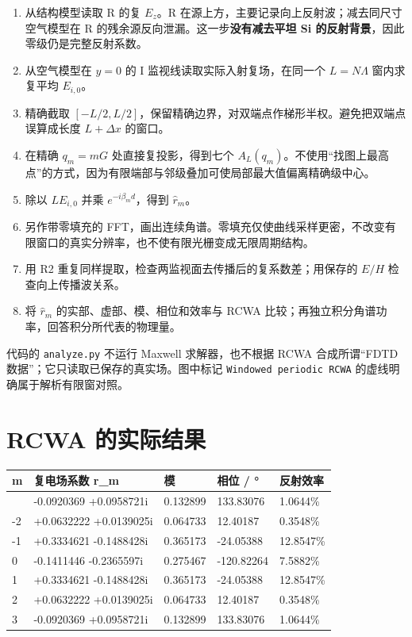 \documentclass[
  chinese,
  UTF8,
  a4paper,
  11pt]{ctexart}
\newcounter{none} %
\providecommand{\tightlist}{%
  \setlength{\itemsep}{0pt}\setlength{\parskip}{0pt}}
\begin{document}
\begin{enumerate}
\def\labelenumi{\arabic{enumi}.}
\tightlist
\item
  从结构模型读取 R 的复 \(E_z\)。R
  在源上方，主要记录向上反射波；减去同尺寸空气模型在 R
  的残余源反向泄漏。这一步\textbf{没有减去平坦 Si
  的反射背景}，因此零级仍是完整反射系数。
\item
  从空气模型在 \(y=0\) 的 I 监视线读取实际入射复场，在同一个
  \(L=N\Lambda\) 窗内求复平均 \(E_{i,0}\)。
\item
  精确截取
  \([-L/2,L/2]\)，保留精确边界，对双端点作梯形半权。避免把双端点误算成长度
  \(L+\Delta x\) 的窗口。
\item
  在精确 \(q_m=mG\) 处直接复投影，得到七个
  \(A_L(q_m)\)。不使用``找图上最高点''的方式，因为有限端部与邻级叠加可使局部最大值偏离精确级中心。
\item
  除以 \(L E_{i,0}\) 并乘 \(e^{-i\beta_md}\)，得到 \(\widehat r_m\)。
\item
  另作带零填充的
  FFT，画出连续角谱。零填充仅使曲线采样更密，不改变有限窗口的真实分辨率，也不使有限光栅变成无限周期结构。
\item
  用 R2 重复同样提取，检查两监视面去传播后的复系数差；用保存的 \(E/H\)
  检查向上传播波关系。
\item
  将 \(\widehat r_m\) 的实部、虚部、模、相位和效率与 RCWA
  比较；再独立积分角谱功率，回答积分所代表的物理量。
\end{enumerate}

代码的 \texttt{analyze.py} 不运行 Maxwell 求解器，也不根据 RCWA
合成所谓``FDTD 数据''；它只读取已保存的真实场。图中标记
\texttt{Windowed\ periodic\ RCWA} 的虚线明确属于解析有限窗对照。

\section{RCWA 的实际结果}\label{rcwa-ux7684ux5b9eux9645ux7ed3ux679c}

{\def\LTcaptype{none} %
\begin{longtable}[]{@{}lllll@{}}
\toprule\noalign{}
m & 复电场系数 r\_m & 模 & 相位 / ° & 反射效率 \\
\midrule\noalign{}
\endhead
\bottomrule\noalign{}
\endlastfoot
-3 & -0.0920369 +0.0958721i & 0.132899 & 133.83076 & 1.0644\% \\
-2 & +0.0632222 +0.0139025i & 0.064733 & 12.40187 & 0.3548\% \\
-1 & +0.3334621 -0.1488428i & 0.365173 & -24.05388 & 12.8547\% \\
0 & -0.1411446 -0.2365597i & 0.275467 & -120.82264 & 7.5882\% \\
1 & +0.3334621 -0.1488428i & 0.365173 & -24.05388 & 12.8547\% \\
2 & +0.0632222 +0.0139025i & 0.064733 & 12.40187 & 0.3548\% \\
3 & -0.0920369 +0.0958721i & 0.132899 & 133.83076 & 1.0644\% \\
\end{longtable}
}
\end{document}
